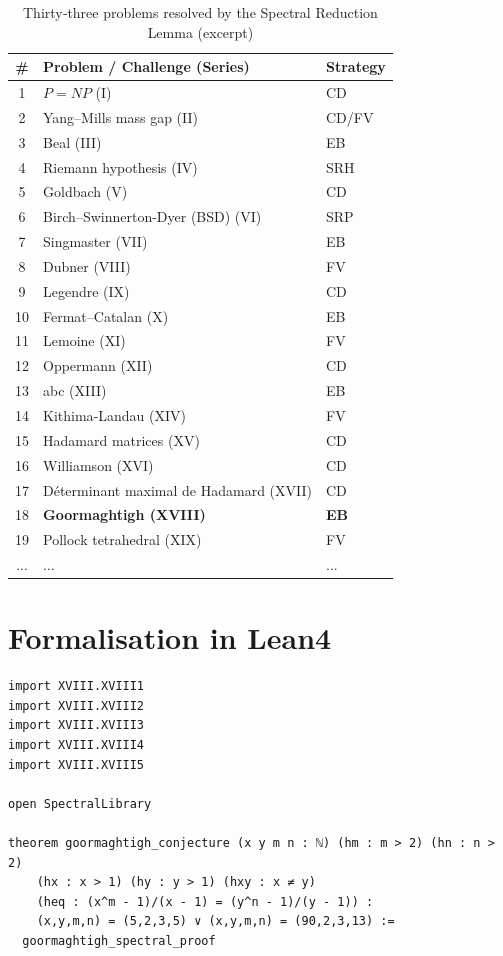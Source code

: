 \documentclass[11pt,a4paper]{article}
\begin{document}
\begin{center}
\small
\begin{longtable}{@{}cll@{}}
\caption{Thirty‑three problems resolved by the Spectral Reduction Lemma (excerpt)}\\
\toprule
\# & Problem / Challenge (Series) & Strategy \\
\midrule
1 & \(P = NP\) (I) & CD \\
2 & Yang–Mills mass gap (II) & CD/FV \\
3 & Beal (III) & EB \\
4 & Riemann hypothesis (IV) & SRH \\
5 & Goldbach (V) & CD \\
6 & Birch–Swinnerton-Dyer (BSD) (VI) & SRP \\
7 & Singmaster (VII) & EB \\
8 & Dubner (VIII) & FV \\
9 & Legendre (IX) & CD \\
10 & Fermat–Catalan (X) & EB \\
11 & Lemoine (XI) & FV \\
12 & Oppermann (XII) & CD \\
13 & abc (XIII) & EB \\
14 & Kithima‑Landau (XIV) & FV \\
15 & Hadamard matrices (XV) & CD \\
16 & Williamson (XVI) & CD \\
17 & Déterminant maximal de Hadamard (XVII) & CD \\
18 & \textbf{Goormaghtigh (XVIII)} & \textbf{EB} \\
19 & Pollock tetrahedral (XIX) & FV \\
... & ... & ... \\
\bottomrule
\end{longtable}
\end{center}

\section{Formalisation in Lean4}

\begin{lstlisting}[style=lean, caption={MainXVIII.lean (final)}]
import XVIII.XVIII1
import XVIII.XVIII2
import XVIII.XVIII3
import XVIII.XVIII4
import XVIII.XVIII5

open SpectralLibrary

theorem goormaghtigh_conjecture (x y m n : ℕ) (hm : m > 2) (hn : n > 2)
    (hx : x > 1) (hy : y > 1) (hxy : x ≠ y)
    (heq : (x^m - 1)/(x - 1) = (y^n - 1)/(y - 1)) :
    (x,y,m,n) = (5,2,3,5) ∨ (x,y,m,n) = (90,2,3,13) :=
  goormaghtigh_spectral_proof
\end{lstlisting}
\end{document}
